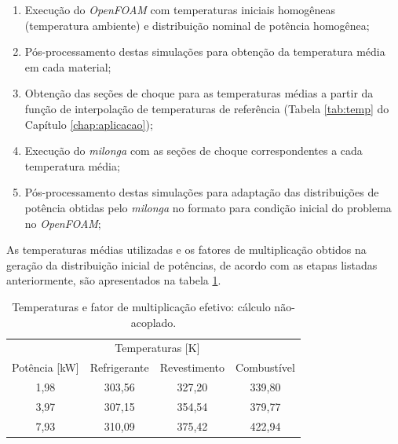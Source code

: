 \begin{enumerate}
\item Execução do \textit{OpenFOAM} com temperaturas iniciais homogêneas (temperatura ambiente) e distribuição nominal de potência homogênea;
\item Pós-processamento destas simulações para obtenção da temperatura média em cada material; %
\item Obtenção das seções de choque para as temperaturas médias a partir da função de interpolação de temperaturas
  de referência (Tabela \ref{tab:temp} do Capítulo \ref{chap:aplicacao});
\item Execução do \textit{milonga} com as seções de choque correspondentes a cada temperatura média;
\item Pós-processamento destas simulações para adaptação das distribuições de potência obtidas pelo \textit{milonga}
  no formato para condição inicial do problema no \textit{OpenFOAM};
\end{enumerate}

As temperaturas médias utilizadas e os fatores de multiplicação obtidos na geração da distribuição inicial
de potências, de acordo com as etapas listadas anteriormente, são apresentados na tabela \ref{tab:temp-keff}.

\begin{table}[htb]
  \centering
\caption{Temperaturas e fator de multiplicação efetivo: cálculo não-acoplado.}
\label{tab:temp-keff}
\begin{tabular}{cccc}
\multicolumn{1}{l}{}         & \multicolumn{2}{c}{Temperaturas [K]}                                                                      & \multicolumn{1}{l}{}     \\ \cline{2-4}
\multicolumn{1}{c}{Potência [kW]} & \multicolumn{1}{c}{Refrigerante} & \multicolumn{1}{c}{Revestimento} & \multicolumn{1}{c}{Combustível}  \\ \hline
1,98                      & 303,56                         & 327,20                         & 339,80                                         \\ \hline
3,97                      & 307,15                         & 354,54                         & 379,77                                          \\ \hline
7,93                      & 310,09                         & 375,42                         & 422,94                                         
\end{tabular}
\end{table}

